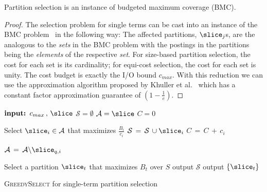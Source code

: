 \begin{lemma}
  Partition selection is an instance of budgeted maximum coverage (BMC).
\end{lemma}
\begin{proof}{}
  The selection problem for single terms can be cast into an instance of the BMC problem~\cite{budgetedmaxcover} in the following way:  
The affected partitions, $\slice_{j}$s, are the analogous to
the \emph{sets} in the BMC problem with the postings in
the partitions being the \emph{elements} of the respective
\emph{set}. %
  For size-based partition selection,
  the cost for each set is its cardinality; for equi-cost selection,
  the cost for each set is unity. The cost budget is exactly the
  I/O bound $c_{max}$. With
  this reduction we can use the approximation algorithm proposed 
  by Khuller et al.~\cite{budgetedmaxcover} which has a constant factor approximation guarantee of 
  $(1 - \frac{1}{e})$.\end{proof} 


\begin{algorithm}[h!]
  \begin{algorithmic}[1]
    \STATE $\textbf{input: } c_{max}\, ,\, \slice$
    \STATE $\mathcal{S} = \emptyset$ \STATE $\mathcal{A} = \slice$
    \STATE $C = 0$
    
    \STATE \REPEAT \STATE Select $\slice_{i} \in \mathcal{A}$ that
    maximizes $\frac{B_i}{c_i}$ 
    \STATE $\mathcal{S} \,= \,\mathcal{S} \,\cup \slice_{i}$ \STATE $C \,= \,C \,+
    \,c_i$
    \ENDIF
    
    \STATE $\mathcal{A} \,= \,\mathcal{A} \backslash \slice_{q,i}$
     \STATE
    
    \STATE Select a partition $\slice_{t}$ that maximizes $B_t$ over $S$
     \STATE output $\mathcal{S}$ \ELSE \STATE output $ \{
    \slice_{t} \} $
    \ENDIF
  \end{algorithmic}
    
  \caption{\textsc{GreedySelect} for single-term partition selection}
  \label{alg:GreedySelection}
\end{algorithm}

